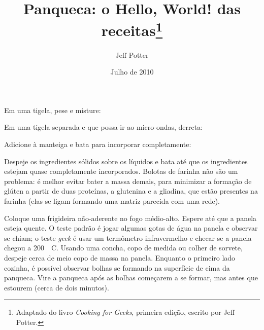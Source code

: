 \documentclass[a4paper,oneside]{article}
\title{Panqueca: o Hello, World! das receitas\footnote{Adaptado do livro
\emph{Cooking for Geeks}, primeira edição, escrito por Jeff Potter.}}
\author{Jeff Potter}
\date{Julho de 2010}
\begin{document}
\frenchspacing

\maketitle

Em uma tigela, pese e misture:


Em uma tigela separada e que possa ir ao micro-ondas, derreta:


Adicione à manteiga e bata para incorporar completamente:


Despeje os ingredientes sólidos sobre os líquidos e bata até que os
ingredientes estejam quase completamente incorporados. Bolotas de farinha
não são um problema: é melhor evitar bater a massa demais, para minimizar a
formação de glúten a partir de duas proteínas, a glutenina e a gliadina, que
estão presentes na farinha (elas se ligam formando uma matriz parecida com
uma rede).

Coloque uma frigideira não-aderente no fogo médio-alto. Espere até que a
panela esteja quente. O teste padrão é jogar algumas gotas de água na panela
e observar se chiam; o teste \emph{geek} é usar um termômetro infravermelho
e checar se a panela chegou a 200~\textdegree~C. Usando uma concha, copo de
medida ou colher de sorvete, despeje cerca de meio copo de massa na panela.
Enquanto o primeiro lado cozinha, é possível observar bolhas se formando na
superfície de cima da panqueca. Vire a panqueca após as bolhas começarem a
se formar, mas antes que estourem (cerca de dois minutos).
\end{document}
